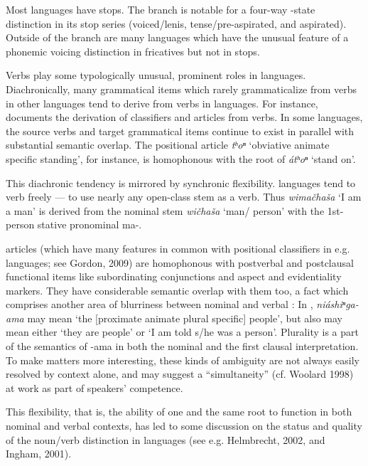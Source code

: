 \begin{refsection}
Most  languages have  stops. The  branch is notable for a four-way -state distinction in its stop series (voiced/lenis, tense/pre-aspirated,  and aspirated). Outside of the  branch are many  languages which have the unusual feature of a phonemic voicing distinction in fricatives but not in stops.


Verbs play some typologically unusual, prominent roles in  languages. Diachronically, many grammatical items which rarely grammaticalize from verbs in other languages tend to derive from verbs in  languages. For instance, \citet{Rankin1977} documents the derivation of classifiers and articles from verbs. In some  languages, the source verbs and target grammatical items continue to exist in parallel with substantial semantic overlap. The  positional article \textit{tʰoⁿ} `obviative animate specific standing', for instance, is homophonous with the root of \textit{\'atʰoⁿ} `stand on'.


This diachronic tendency is mirrored by synchronic flexibility.  languages tend to verb freely --- to use nearly any open-class stem as a verb. Thus  \textit{wima\v{c}ha\v{s}a} `I am a man' is derived from the nominal stem \textit{wi\v{c}ha\v{s}a} `man/ person' with the 1st-person stative pronominal ma-.

 articles (which have many features in common with positional classifiers in e.g.  languages; see Gordon, 2009) are homophonous with postverbal and postclausal functional items like subordinating conjunctions and aspect and evidentiality markers. They have considerable semantic overlap with them too, a fact which comprises another area of blurriness between nominal and verbal : In , \textit{ni\'ashiⁿga-ama} may mean `the [proximate animate plural specific] people', but also may mean either `they are people' or `I am told s/he was a person'. Plurality is a part of the semantics of -ama in both the nominal and the first clausal interpretation. To make matters more interesting, these kinds of ambiguity are not always easily resolved by context alone, and may suggest a ``simultaneity'' (cf. Woolard 1998) at work as part of speakers' competence. 


This flexibility, that is, the ability of one and the same root to function in both nominal and verbal contexts, has led to some discussion on the status and quality of the noun/verb distinction in  languages (see e.g. Helmbrecht, 2002, and Ingham, 2001). 


\end{refsection}
